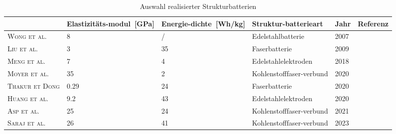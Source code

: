 \begin{table}[ht]
    \centering
    \caption{Auswahl realisierter Strukturbatterien}
    \begin{tabular}[t]{m{} m{}<{\centering} m{}<{\centering} m{}<{\centering} m{}<{\centering} m{}<{\centering}}
    \toprule
    &Elastizitäts-modul~[GPa]&Energie-dichte~[Wh/kg]&Struktur-batterieart&Jahr&Referenz\\
    \midrule
    \textsc{Wong et al.}&8&/&Edelstahlbatterie&2007&\cite{Wong2007}\\
    \textsc{Liu et al.}&3&35&Faserbatterie&2009&\cite{Liu2009}\\
    \textsc{Meng et al.}&7&4&Edelstahlelektroden&2018&\cite{Meng2018}\\
    \textsc{Moyer et al.}&35&2&Kohlenstofffaser-verbund&2020&\cite{Moyer2020}\\
    \textsc{Thakur et Dong}&0.29&24&Faserbatterie&2020&\cite{Thakur2020}\\
    \textsc{Huang et al.}&9.2&43&Edelstahlelektroden&2020&\cite{Huang2020}\\
    \textsc{Asp et al.}&25&24&Kohlenstofffaser-verbund&2021&\cite{Asp2021} \\
    \textsc{Saraj et al.}&26&41&Kohlenstofffaser-verbund&2023&\cite{Siraj2023}\\
    \bottomrule
    \end{tabular}
\end{table}%